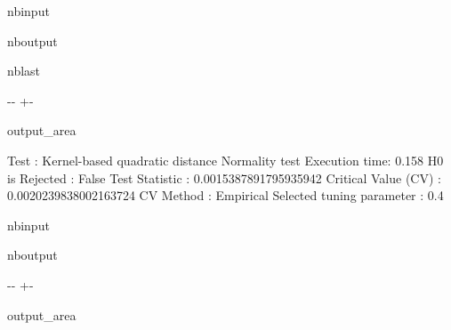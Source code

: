 \documentclass[letterpaper,10pt,english,openany,oneside]{sphinxmanual}
\begin{document}
{{{{\begin{sphinxuseclass}{nbinput}
\end{sphinxuseclass}
\begin{sphinxuseclass}{nboutput}
\begin{sphinxuseclass}{nblast}
{

\kern-\sphinxverbatimsmallskipamount\kern-\baselineskip
\kern+\FrameHeightAdjust\kern-\fboxrule
\vspace{\nbsphinxcodecellspacing}

\begin{sphinxuseclass}{output_area}
\begin{sphinxuseclass}{}


\begin{sphinxVerbatim}[commandchars=\\\{\}]
Test : Kernel-based quadratic distance Normality test
Execution time: 0.158
H0 is Rejected : False
Test Statistic : 0.0015387891795935942
Critical Value (CV) : 0.0020239838002163724
CV Method : Empirical
Selected tuning parameter : 0.4
\end{sphinxVerbatim}



\end{sphinxuseclass}
\end{sphinxuseclass}
}

\end{sphinxuseclass}
\end{sphinxuseclass}
\begin{sphinxuseclass}{nbinput}
{
\begin{sphinxVerbatim}[commandchars=\\\{\}]
\llap{\color{nbsphinxin}[5]:\,\hspace{\fboxrule}\hspace{\fboxsep}}
\end{sphinxVerbatim}
}

\end{sphinxuseclass}
\begin{sphinxuseclass}{nboutput}
{

\kern-\sphinxverbatimsmallskipamount\kern-\baselineskip
\kern+\FrameHeightAdjust\kern-\fboxrule
\vspace{\nbsphinxcodecellspacing}

\begin{sphinxuseclass}{output_area}
\begin{sphinxuseclass}{}



\end{sphinxuseclass}
\end{sphinxuseclass}}
\end{sphinxuseclass}}}}}
\end{document}
